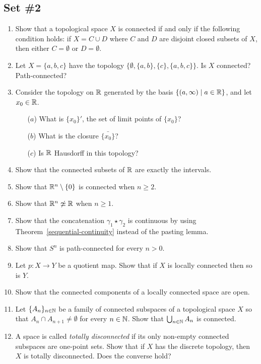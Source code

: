 \subsection{Set \#2}
\begin{enumerate}[label=2.\arabic*]
  \item Show that a topological space $X$ is connected if and only if the following condition holds: if $X = C \cup D$ where $C$ and $D$ are disjoint closed subsets of $X$, then either $C = \emptyset$ or $D = \emptyset$.
  \item Let $X = \{a,b,c\}$ have the topology $\{\emptyset,\{a,b\},\{c\},\{a,b,c\}\}$. Is $X$ connected? Path-connected?
  \item Consider the topology on $\mathbb{R}$ generated by the basis $\{(a,\infty) \mid a \in \mathbb{R} \}$, and let $x_0 \in \mathbb{R}$. \begin{itemize}
    \item[($a$)] What is $\{x_0\}'$, the set of limit points of $\{x_0\}$?
    \item[($b$)] What is the closure $\bar{\{x_0\}}$?
    \item[($c$)] Is $\mathbb{R}$ Hausdorff in this topology?
  \end{itemize}
  \item \label{connected-implies-interval} Show that the connected subsets of $\mathbb{R}$ are exactly the intervals.
  \item \label{origin-removed-connected} Show that $\mathbb{R}^n \setminus \{0\}$ is connected when $n \geq 2$.
  \item \label{invariance-of-dimension-exercise} Show that $\mathbb{R}^n \not\simeq \mathbb{R}$ when $n \geq 1$.
  \item Show that the concatenation $\gamma_1 \star \gamma_2$ is continuous by using Theorem~\ref{sequential-continuity} instead of the pasting lemma.
  \item Show that $S^n$ is path-connected for every $n > 0$.
  \item Let $p : X \to Y$ be a quotient map. Show that if $X$ is locally connected then so is $Y$.
  \item \label{locally-connected-open} Show that the connected components of a locally connected space are open.
  \item Let $\{A_n\}_{n \in \mathbb{N}}$ be a family of connected subspaces of a topological space $X$ so that $A_n \cap A_{n+1} \not= \emptyset$ for every $n \in \mathbb{N}$. Show that $\bigcup_{n \in \mathbb{N}} A_n$ is connected.
  \item A space is called \emph{totally disconnected} if its only non-empty connected subspaces are one-point sets. Show that if $X$ has the discrete topology, then $X$ is totally disconnected. Does the converse hold?

\end{enumerate}
